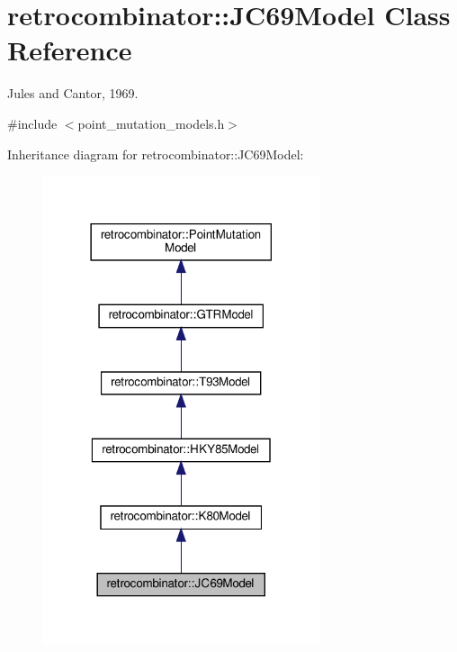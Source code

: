 \hypertarget{classretrocombinator_1_1JC69Model}{}\section{retrocombinator\+:\+:J\+C69\+Model Class Reference}
\label{classretrocombinator_1_1JC69Model}


Jules and Cantor, 1969.  




{\ttfamily \#include $<$point\+\_\+mutation\+\_\+models.\+h$>$}



Inheritance diagram for retrocombinator\+:\+:J\+C69\+Model\+:\nopagebreak
\begin{figure}[H]
\begin{center}
\leavevmode
\includegraphics[width=230pt]{classretrocombinator_1_1JC69Model__inherit__graph}
\end{center}
\end{figure}


